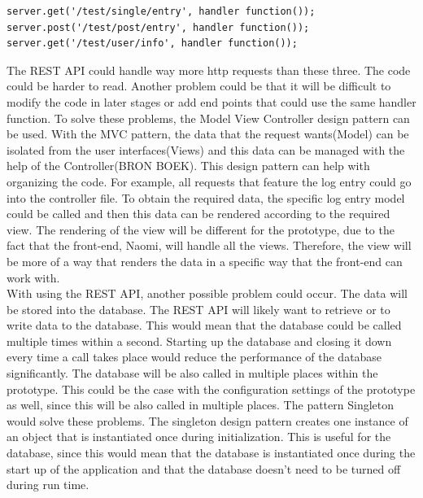 \documentclass[paper=a4, fontsize=11pt,twoside]{scrartcl}	%
\begin{document}
\begin{lstlisting}[frame=single]
server.get('/test/single/entry', handler function());
server.post('/test/post/entry', handler function());
server.get('/test/user/info', handler function());
\end{lstlisting} 
The REST API could handle way more http requests than these three. The code could be harder to read. Another problem could be that it will be difficult to modify the code in later stages or add end points that could use the same handler function. To solve these problems, the Model View Controller design pattern can be used. With the MVC pattern, the data that the request wants(Model) can be isolated from the user interfaces(Views) and this data can be managed with the help of the Controller(BRON BOEK). This design pattern can help with organizing the code. For example, all requests that feature the log entry could go into the controller file. To obtain the required data, the specific log entry model could be called and then this data can be rendered according to the required view. The rendering of the view will be different for the prototype, due to the fact that the front-end, Naomi, will handle all the views. Therefore, the view will be more of a way that renders the data in a specific way that the front-end can work with.\\
With using the REST API, another possible problem could occur. The data will be stored into the database. The REST API will likely want to retrieve or to write data to the database. This would mean that the database could be called multiple times within a second. Starting up the database and closing it down every time a call takes place would reduce the performance of the database significantly. The database will be also called in multiple places within the prototype. This could be the case with the configuration settings of the prototype as well, since this will be also called in multiple places. The pattern Singleton would solve these problems. The singleton design pattern creates one instance of an object that is instantiated once during initialization. This is useful for the database, since this would mean that the database is instantiated once during the start up of the application and that the database doesn't need to be turned off during run time.   
 



   
\newpage
\end{document}
